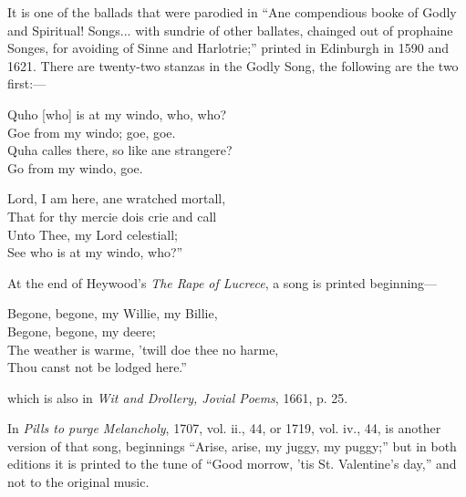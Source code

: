 It is one of the ballads that were parodied in “Ane compendious booke of
Godly and Spiritual! Songs... with sundrie of other ballates, chainged out of
prophaine Songes, for avoiding of Sinne and Harlotrie;” printed in Edinburgh
in 1590 and 1621. There are twenty-two stanzas in the Godly Song, the following
are the two first:—
\settowidth{\versewidth}{Quho [who] is at my windo, who, who?}
\begin{scverse}
Quho [who] is at my windo, who, who?\\
Goe from my windo; goe, goe.\\
Quha calles there, so like ane strangere?\\
Go from my windo, goe.

Lord, I am here, ane wratched mortall,\\
That for thy mercie dois crie and call\\
Unto Thee, my Lord celestiall;\\
See who is at my windo, who?”
\end{scverse}

At the end of Heywood’s \textit{The Rape of Lucrece}, a song is printed beginning—
\settowidth{\versewidth}{The weather is warme, ’twill doe thee no harme,}
\begin{scverse}
\begin{altverse}
Begone, begone, my Willie, my Billie,\\
Begone, begone, my deere;\\
The weather is warme, ’twill doe thee no harme,\\
Thou canst not be lodged here.”
\end{altverse}
\end{scverse}

which is also in \textit{Wit and Drollery, Jovial Poems}, 1661, p. 25.
\pagebreak
\origpage{}%

In \textit{Pills to purge Melancholy}, 1707, vol. ii., 44, or 1719, vol. iv., 44, is another
version of that song, beginnings “Arise, arise, my juggy, my puggy;” but in
both editions it is printed to the tune of “Good morrow, ’tis St. Valentine’s day,”
and not to the original music.

